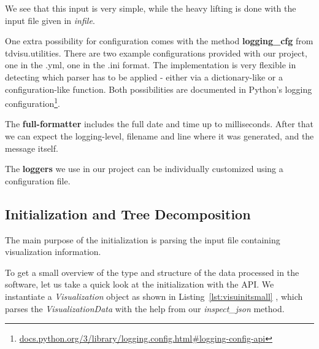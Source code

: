\documentclass[a4paper, 12pt, bibliography=totoc]{scrartcl}
\begin{document}
We see that this input is very simple, while the heavy lifting is done with the input file given in \textit{infile}.

One extra possibility for configuration comes with the method \textbf{logging\_cfg} from {tdvisu.utilities}. There are two example configurations provided with our project, one in the .yml, one in the .ini format. The implementation is very flexible in detecting which parser has to be applied - either via a dictionary-like or a configuration-like function. Both possibilities are documented in Python's {logging configuration}\footnote{\url{docs.python.org/3/library/logging.config.html\#logging-config-api}}.

%

The \textbf{full-formatter} includes the full date and time up to milliseconds. After that we can expect the logging-level, filename and line where it was generated, and the message itself.

The \textbf{loggers} we use in our project 
can be individually customized using a configuration file.

\subsection{Initialization and Tree Decomposition}

The main purpose of the initialization is parsing the input file containing visualization information.

To get a small overview of the type and structure of the data processed in the software, let us take a quick look at the initialization with the API. We instantiate a \textit{Visualization} object as shown in Listing~\ref{lst:visuinitsmall} , which parses the \textit{VisualizationData} with the help from our \textit{inspect\_json} method. 
\end{document}
